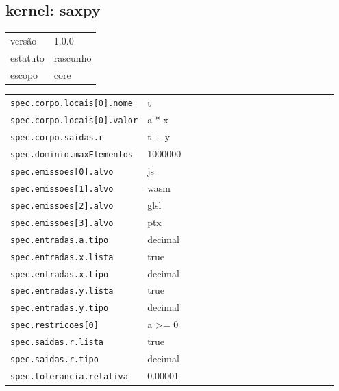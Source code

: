 \subsection*{kernel: saxpy}
\begin{tabular}{@{}ll@{}}
versão & 1.0.0 \\
estatuto & rascunho \\
escopo & core \\
\end{tabular}

\begin{tabular}{@{}p{0.35\linewidth}p{0.6\linewidth}@{}}
\texttt{spec.corpo.locais[0].nome} & t \\
\texttt{spec.corpo.locais[0].valor} & a * x \\
\texttt{spec.corpo.saidas.r} & t + y \\
\texttt{spec.dominio.maxElementos} & 1000000 \\
\texttt{spec.emissoes[0].alvo} & js \\
\texttt{spec.emissoes[1].alvo} & wasm \\
\texttt{spec.emissoes[2].alvo} & glsl \\
\texttt{spec.emissoes[3].alvo} & ptx \\
\texttt{spec.entradas.a.tipo} & decimal \\
\texttt{spec.entradas.x.lista} & true \\
\texttt{spec.entradas.x.tipo} & decimal \\
\texttt{spec.entradas.y.lista} & true \\
\texttt{spec.entradas.y.tipo} & decimal \\
\texttt{spec.restricoes[0]} & a >= 0 \\
\texttt{spec.saidas.r.lista} & true \\
\texttt{spec.saidas.r.tipo} & decimal \\
\texttt{spec.tolerancia.relativa} & 0.00001 \\
\end{tabular}
